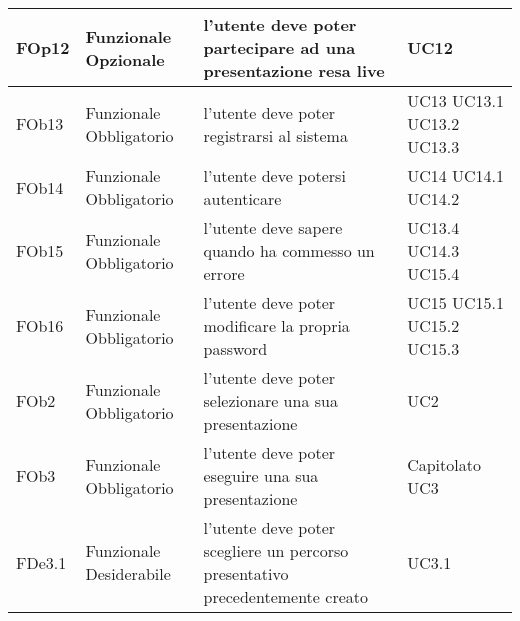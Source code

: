\begin{longtable}{|l|p{2.5cm}|p{5cm}|p{3.5cm}|}
\hline
FOp12 & Funzionale \linebreak Opzionale & l'utente deve poter partecipare ad una presentazione resa live & UC12 \linebreak \\
\hline
FOb13 & Funzionale \linebreak Obbligatorio & l'utente deve poter registrarsi al sistema & UC13 \linebreak UC13.1 \linebreak UC13.2 \linebreak UC13.3 \linebreak \\
\hline
FOb14 & Funzionale \linebreak Obbligatorio & l'utente deve potersi autenticare & UC14 \linebreak UC14.1 \linebreak UC14.2 \linebreak \\
\hline
FOb15 & Funzionale \linebreak Obbligatorio & l'utente deve sapere quando ha commesso un errore & UC13.4 \linebreak UC14.3 \linebreak UC15.4 \linebreak \\
\hline
FOb16 & Funzionale \linebreak Obbligatorio & l'utente deve poter modificare la propria password & UC15 \linebreak UC15.1 \linebreak UC15.2 \linebreak UC15.3 \linebreak \\
\hline
FOb2 & Funzionale \linebreak Obbligatorio & l'utente deve poter selezionare una sua presentazione & UC2 \linebreak \\
\hline
FOb3 & Funzionale \linebreak Obbligatorio & l'utente deve poter eseguire una sua presentazione & Capitolato \linebreak UC3 \linebreak \\
\hline
FDe3.1 & Funzionale \linebreak Desiderabile & l'utente deve poter scegliere un percorso presentativo precedentemente creato & UC3.1 \linebreak  \\

\end{longtable}
